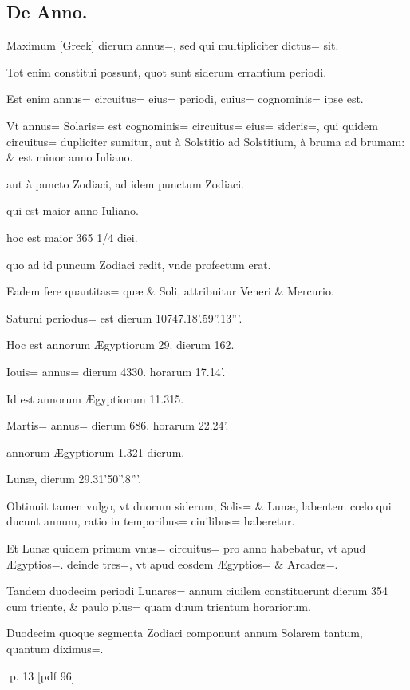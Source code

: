 \subsection{De Anno.}
\setcounter{parcount}{0}
\begin{parnumbers}

Maximum [Greek] dierum annus=, sed qui multipliciter dictus= sit.

Tot enim constitui possunt, quot sunt siderum errantium periodi.

Est enim annus= circuitus= eius= periodi, cuius= cognominis= ipse est.

Vt annus= Solaris= est cognominis= circuitus= eius=  sideris=, qui quidem circuitus= dupliciter sumitur, aut à Solstitio ad Solstitium, à bruma ad brumam: \& est minor anno Iuliano.

aut à puncto Zodiaci, ad idem punctum Zodiaci.

qui est maior anno Iuliano.

hoc est maior 365 1/4 diei.

quo ad id puncum Zodiaci redit, vnde profectum erat.

Eadem fere quantitas= quæ \& Soli, attribuitur Veneri \& Mercurio.

Saturni periodus= est dierum 10747.18'.59''.13'''.

Hoc est annorum Ægyptiorum 29. dierum 162.

Iouis= annus= dierum 4330. horarum 17.14'.

Id est annorum Ægyptiorum 11.315.

Martis= annus= dierum 686. horarum 22.24'.

annorum Ægyptiorum 1.321 dierum.

Lunæ, dierum 29.31'50''.8'''.

Obtinuit tamen vulgo, vt duorum siderum, Solis= \& Lunæ, labentem cœlo qui ducunt annum, ratio in  temporibus= ciuilibus= haberetur.

Et Lunæ quidem primum vnus= circuitus= pro anno habebatur, vt apud Ægyptios=. deinde tres=, vt apud eosdem Ægyptios= \& Arcades=.

Tandem duodecim periodi Lunares= annum ciuilem constituerunt dierum 354 cum triente, \& paulo plus= quam duum trientum horariorum.

Duodecim quoque segmenta Zodiaci componunt annum Solarem tantum, quantum diximus=.

\end{parnumbers}
\clearpage
p. 13 [pdf 96]


